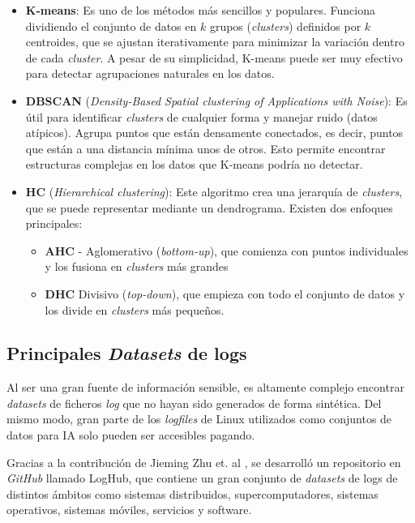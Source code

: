 \begin{itemize}
    \item \textbf{K-means}: Es uno de los métodos más sencillos y populares. Funciona dividiendo el conjunto de datos en \( k \) grupos (\textit{clusters}) definidos por \( k \) centroides, que se ajustan iterativamente para minimizar la variación dentro de cada \textit{cluster}. A pesar de su simplicidad, K-means puede ser muy efectivo para detectar agrupaciones naturales en los datos.
    
    \item \textbf{\gls{DBSCAN}} (\textit{Density-Based Spatial clustering of Applications with Noise}): Es útil para identificar \textit{clusters} de cualquier forma y manejar ruido (datos atípicos). Agrupa puntos que están densamente conectados, es decir, puntos que están a una distancia mínima unos de otros. Esto permite encontrar estructuras complejas en los datos que K-means podría no detectar.

    \item \textbf{\gls{HC}} (\textit{Hierarchical clustering}): Este algoritmo crea una jerarquía de \textit{clusters}, que se puede representar mediante un dendrograma. 
    Existen dos enfoques principales: 
        \begin{itemize}
            \item  \textbf{\gls{AHC}} - Aglomerativo (\textit{bottom-up}), que comienza con puntos individuales y los fusiona en \textit{clusters} más grandes
            \item  \textbf{\gls{DHC}} Divisivo (\textit{top-down}), que empieza con todo el conjunto de datos y los divide en \textit{clusters} más pequeños.
        \end{itemize}
\end{itemize}


\subsection{Principales \textit{Datasets} de logs}

Al ser una gran fuente de información sensible, es altamente complejo encontrar \textit{datasets} de ficheros \textit{log} que no hayan sido generados de forma sintética. Del mismo modo, gran parte de los \textit{logfiles} de Linux utilizados como conjuntos de datos para \gls{IA} solo pueden ser accesibles pagando. 

Gracias a la contribución de Jieming Zhu et. al \cite{loghub2023}, se desarrolló un repositorio en \textit{GitHub} llamado LogHub, que contiene un gran conjunto de \textit{datasets} de logs de distintos ámbitos como sistemas distribuidos, supercomputadores, sistemas operativos, sistemas móviles, servicios y software.

